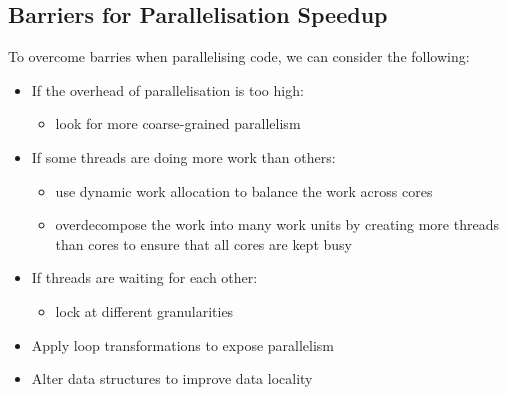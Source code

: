 \documentclass{article}
\begin{document}
\subsection{Barriers for Parallelisation Speedup}
To overcome barries when parallelising code, we can consider the
following:
\begin{itemize}
    \item If the overhead of parallelisation is too high:
        \begin{itemize}
            \item look for more coarse-grained parallelism
        \end{itemize}
    \item If some threads are doing more work than others:
        \begin{itemize}
            \item use dynamic work allocation to balance the work across cores
            \item overdecompose the work into many work units by creating
            more threads than cores to ensure that all cores are kept busy
        \end{itemize}
    \item If threads are waiting for each other:
        \begin{itemize}
            \item lock at different granularities
        \end{itemize}
    \item Apply loop transformations to expose parallelism
    \item Alter data structures to improve data locality
\end{itemize}
\end{document}

